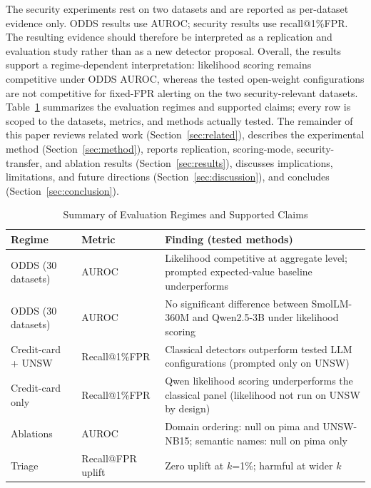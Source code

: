 \documentclass[conference]{IEEEtran}
\begin{document}
The security experiments rest on two datasets and are reported as per-dataset evidence only.
ODDS results use AUROC; security results use recall@1\%FPR.
The resulting evidence should therefore be interpreted as a replication and evaluation study rather than as a new detector proposal.
Overall, the results support a regime-dependent interpretation: likelihood scoring remains competitive under ODDS AUROC, whereas the tested open-weight configurations are not competitive for fixed-FPR alerting on the two security-relevant datasets.
Table~\ref{tab:regime} summarizes the evaluation regimes and supported claims; every row is scoped to the datasets, metrics, and methods actually tested.
The remainder of this paper reviews related work (Section~\ref{sec:related}), describes the experimental method (Section~\ref{sec:method}), reports replication, scoring-mode, security-transfer, and ablation results (Section~\ref{sec:results}), discusses implications, limitations, and future directions (Section~\ref{sec:discussion}), and concludes (Section~\ref{sec:conclusion}).

\begin{table}[t]
\caption{Summary of Evaluation Regimes and Supported Claims}
\label{tab:regime}
\begin{center}
\renewcommand{\arraystretch}{1.2}
\small
\begin{tabular}{|p{1.5in}|p{1.1in}|p{3.6in}|}
\hline
\textbf{Regime} & \textbf{Metric} & \textbf{Finding (tested methods)} \\
\hline
ODDS (30 datasets) & AUROC & Likelihood competitive at aggregate level; prompted expected-value baseline underperforms \\
ODDS (30 datasets) & AUROC & No significant difference between SmolLM-360M and Qwen2.5-3B under likelihood scoring \\
Credit-card + UNSW & Recall@1\%FPR & Classical detectors outperform tested LLM configurations (prompted only on UNSW) \\
Credit-card only & Recall@1\%FPR & Qwen likelihood scoring underperforms the classical panel (likelihood not run on UNSW by design) \\
Ablations & AUROC & Domain ordering: null on pima and UNSW-NB15; semantic names: null on pima only \\
Triage & Recall@FPR uplift & Zero uplift at $k$=1\%; harmful at wider $k$ \\
\hline
\end{tabular}
\end{center}
\end{table}
\end{document}
